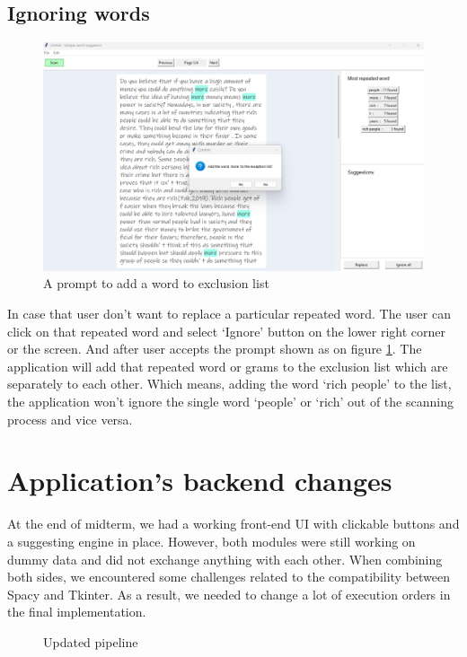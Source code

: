 \documentclass[12pt,oneside,openright,a4paper]{cpe-english-project}
\begin{document}
\subsection{Ignoring words}
\begin{figure}[!h]\centering
\includegraphics[width=15cm]{./img/chp4/IgnorePrompt.png}
\caption{A prompt to add a word to exclusion list}\label{fig:ignore}
\end{figure}
In case that user don’t want to replace a particular repeated word. The user can click on that repeated word and select ‘Ignore’ button on the lower right corner or the screen. And after user accepts the prompt shown as on figure \ref{fig:ignore}. The application will add that repeated word or grams to the exclusion list which are separately to each other. Which means, adding the word ‘rich people’ to the list, the application won’t ignore the single word ‘people’ or ‘rich’ out of the scanning process and vice versa. 


\section{Application's backend changes}
At the end of midterm, we had a working front-end UI with clickable buttons and a suggesting engine in place. However, both modules were still working on dummy data and did not exchange anything with each other. When combining both sides, we encountered some challenges related to the compatibility between Spacy and Tkinter. As a result, we needed to change a lot of execution orders in the final implementation.
\begin{figure}[!h]\centering
\setlength{\fboxrule}{0.2mm} %
\setlength{\fboxsep}{1cm}
\caption{Updated pipeline}\label{fig:updated pipeline}
\end{figure}
\end{document}
